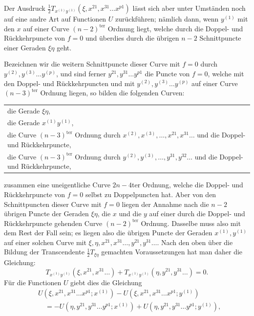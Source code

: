 \documentclass[10pt]{article}
\begin{document}
Der Ausdruck \(\frac12T_{x^{(1)}y^{(1)}}(\xi,x^{21},x^{31}\ldots x^{p1})\) lässt sich aber unter Umständen noch auf eine andre Art auf Functionen \(U\) zurückführen; nämlich dann, wenn \(y^{(1)}\) mit den \(x\) auf einer Curve \((n-2)^{\mathrm{ter}}\) Ordnung liegt, welche durch die Doppel- und Rückkehrpuncte von \(f=0\) und überdies durch die übrigen \(n-2\) Schnittpuncte einer Geraden \(\xi\eta\) geht.

Bezeichnen wir die weitern Schnittpuncte dieser Curve mit \(f=0\) durch \(y^{(2)},y^{(3)}\ldots y^{(p)}\), und sind ferner \(y^{21},y^{31}\ldots y^{p1}\) die Puncte von \(f=0\), welche mit den Doppel- und Rückkehrpuncten und mit \(y^{(2)},y^{(3)}\ldots y^{(p)}\) auf einer Curve \((n-3)^{\mathrm{ter}}\) Ordnung liegen, so bilden die folgenden Curven:

\begin{center}
\begin{tabular}{@{}p{5.15in}@{}}
die Gerade \(\xi\eta\),\\
die Gerade \(x^{(1)}y^{(1)}\),\\
die Curve \((n-3)^{\mathrm{ter}}\) Ordnung durch \(x^{(2)},x^{(3)},\ldots,x^{21},x^{31}\ldots\) und die Doppel- und Rückkehrpuncte,\\
die Curve \((n-3)^{\mathrm{ter}}\) Ordnung durch \(y^{(2)},y^{(3)},\ldots,y^{31},y^{32}\ldots\) und die Doppel- und Rückkehrpuncte,
\end{tabular}
\end{center}
zusammen eine uneigentliche Curve \(2n-4\)ter Ordnung, welche die Doppel- und Rückkehrpuncte von \(f=0\) selbst zu Doppelpuncten hat. Aber von den Schnittpuncten dieser Curve mit \(f=0\) liegen der Annahme nach die \(n-2\) übrigen Puncte der Geraden \(\xi\eta\), die \(x\) und die \(y\) auf einer durch die Doppel- und Rückkehrpuncte gehenden Curve \((n-2)^{\mathrm{ter}}\) Ordnung. Dasselbe muss also mit dem Rest der Fall sein; es liegen also die übrigen Puncte der Geraden \(x^{(1)},y^{(1)}\) auf einer solchen Curve mit \(\xi,\eta,x^{21},x^{31}\ldots,y^{21},y^{31}\ldots\). Nach den oben über die Bildung der Transcendente \(\frac12T_{\xi\eta}\) gemachten Voraussetzungen hat man daher die Gleichung:
\[
T_{x^{(1)}y^{(1)}}(\xi,x^{21},x^{31}\ldots)+T_{x^{(1)}y^{(1)}}(\eta,y^{21},y^{31}\ldots)=0.
\]
Für die Functionen \(U\) giebt dies die Gleichung
\[
\begin{aligned}
&U(\xi,x^{21},x^{31}\ldots x^{p1};x^{(1)})-U(\xi,x^{21},x^{31}\ldots x^{p1};y^{(1)})\\
&\quad=-U(\eta,y^{21},y^{31}\ldots y^{p1};x^{(1)})+U(\eta,y^{21},y^{31}\ldots y^{p1};y^{(1)}),
\end{aligned}
\]
\end{document}
